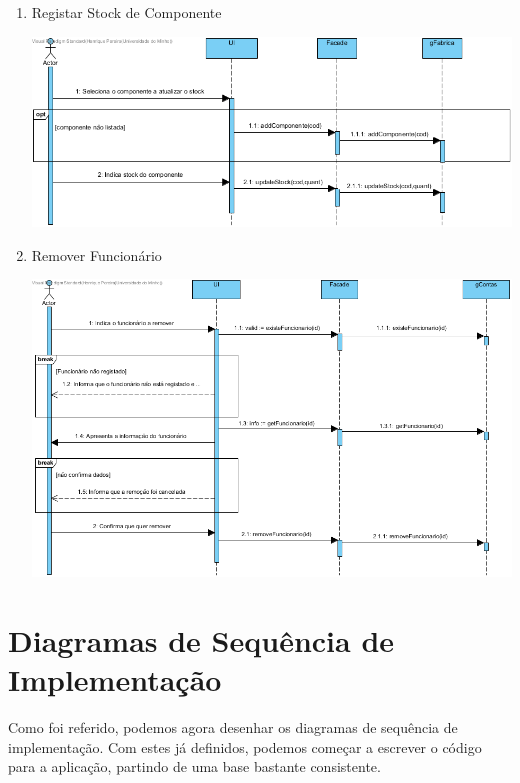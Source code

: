 \documentclass[11pt]{article} %
\begin{document}
\begin{enumerate}
\begin{center}
		\end{center}
	\item Registar Stock de Componente
		\begin{center}
 			\includegraphics[width = 6in]{dsss_registar_stock.png}
		\end{center}
	\item Remover Funcionário
		\begin{center}
 			\includegraphics[width = 6in]{dsss_remover_funcionario.png}
		\end{center}
\end{enumerate}

\section{Diagramas de Sequência de Implementação}
Como foi referido, podemos agora desenhar os diagramas de sequência de implementação. Com estes já definidos, podemos começar a escrever o código para a aplicação, partindo de uma base bastante consistente.
\end{document}
